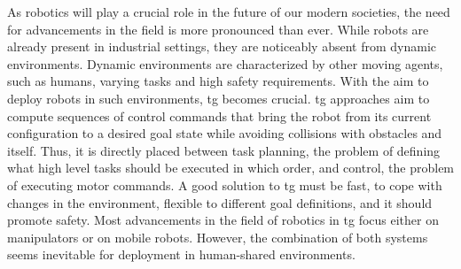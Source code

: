 
As robotics will play a crucial role in the future of our
modern societies, the need for
advancements in the field is more pronounced than ever.
While robots are already present in industrial settings,
they are noticeably absent from dynamic environments.
Dynamic environments are characterized by other moving agents, 
such as humans, varying tasks and high safety requirements.
With the aim to deploy robots in such environments, \ac{tg} becomes crucial.
\Ac{tg} approaches aim to compute sequences
of control commands that bring the robot from its current
configuration to a desired goal state while avoiding
collisions with obstacles and itself. Thus, it is directly placed between 
task planning, the problem of defining what high level tasks should be executed
in which order, and control, the problem of executing motor commands.
A good solution to \ac{tg} must be fast, to cope with changes in the
environment, flexible to different goal definitions, and it should promote safety.
Most advancements in the field of robotics in \ac{tg} focus either on
manipulators or on mobile robots. However, the combination of both
systems seems inevitable for deployment in human-shared environments.


